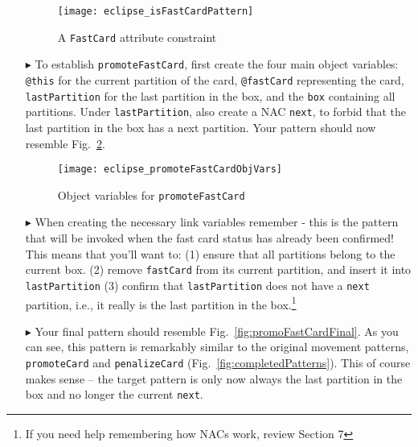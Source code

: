 \begin{itemize}
\begin{figure}[htp]
\begin{center}
  \texttt{[image: eclipse\_isFastCardPattern]}
  \caption{A \texttt{FastCard} attribute constraint}
  \label{fig:isFastCardPattern}
\end{center}
\end{figure}

\newpage

\item[$\blacktriangleright$] To establish \texttt{promoteFastCard}, first create the four main object variables: \texttt{@this} for the
current partition of the card, \texttt{@fastCard} representing the card, \texttt{lastPartition} for the last partition in the box, and the \texttt{box}
containing all partitions. Under \texttt{lastPartition}, also create a NAC \texttt{next}, to forbid that the last partition in the box has a next partition.
Your pattern should now resemble Fig.~\ref{fig:objVarFastCard}.

\vspace{0.5cm}

\begin{figure}[htp]
\begin{center}
  \texttt{[image: eclipse\_promoteFastCardObjVars]}
  \caption{Object variables for \texttt{promoteFastCard}}
  \label{fig:objVarFastCard}
\end{center}
\end{figure}

\item[$\blacktriangleright$] When creating the necessary link variables remember - this is the pattern that will be invoked when the fast card status has
already been confirmed! This means that you'll want to:
(1) ensure that all partitions belong to the current box.
(2) remove \texttt{fastCard} from its current partition, and insert it into \texttt{lastPartition}
(3) confirm that \texttt{lastPartition} does not have a \texttt{next} partition, i.e., it really is the last partition in the box.\footnote{If you need help
remembering how NACs work, review Section 7}

\item[$\blacktriangleright$] Your final pattern should resemble Fig.~\ref{fig:promoFastCardFinal}. As you can see, this pattern is remarkably similar to the
original movement patterns, \texttt{pro\-mote\-Card} and \texttt{pen\-a\-lize\-Card} (Fig.~\ref{fig:completedPatterns}). This of course makes sense -- the
target pattern is only now always the last partition in the box and no longer the current \texttt{next}.


\end{itemize}
